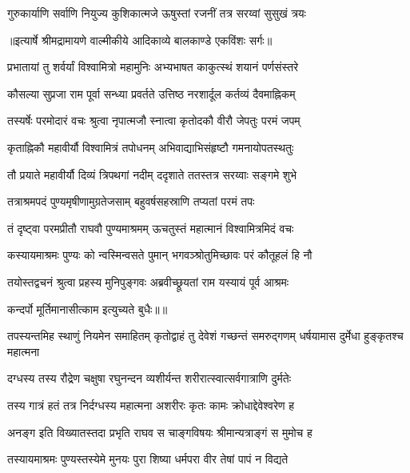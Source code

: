 \twolineshloka
{गुरुकार्याणि सर्वाणि नियुज्य कुशिकात्मजे}
{ऊषुस्तां रजनीं तत्र सरय्वां सुसुखं त्रयः} %


{॥इत्यार्षे श्रीमद्रामायणे वाल्मीकीये आदिकाव्ये बालकाण्डे एकविंशः सर्गः॥}


\twolineshloka
{प्रभातायां तु शर्वर्यां विश्वामित्रो महामुनिः}
{अभ्यभाषत काकुत्स्थं शयानं पर्णसंस्तरे} %

\twolineshloka
{कौसल्या सुप्रजा राम पूर्वा सन्ध्या प्रवर्तते}
{उत्तिष्ठ नरशार्दूल कर्तव्यं दैवमाह्निकम्} %

\twolineshloka
{तस्यर्षेः परमोदारं वचः श्रुत्वा नृपात्मजौ}
{स्नात्वा कृतोदकौ वीरौ जेपतुः परमं जपम्} %

\twolineshloka
{कृताह्निकौ महावीर्यौ विश्वामित्रं तपोधनम्}
{अभिवाद्याभिसंहृष्टौ गमनायोपतस्थतुः} %

\twolineshloka
{तौ प्रयाते महावीर्यौ दिव्यं त्रिपथगां नदीम्}
{ददृशाते ततस्तत्र सरय्वाः सङ्गमे शुभे} %

\twolineshloka
{तत्राश्रमपदं पुण्यमृषीणामुग्रतेजसाम्}
{बहुवर्षसहस्राणि तप्यतां परमं तपः} %

\twolineshloka
{तं दृष्ट्वा परमप्रीतौ राघवौ पुण्यमाश्रमम्}
{ऊचतुस्तं महात्मानं विश्वामित्रमिदं वचः} %

\twolineshloka
{कस्यायमाश्रमः पुण्यः को न्वस्मिन्वसते पुमान्}
{भगवञ्श्रोतुमिच्छावः परं कौतूहलं हि नौ} %

\twolineshloka
{तयोस्तद्वचनं श्रुत्वा प्रहस्य मुनिपुङ्गवः}
{अब्रवीच्छ्रूयतां राम यस्यायं पूर्व आश्रमः} %

{कन्दर्पो मूर्तिमानासीत्काम इत्युच्यते बुधैः॥॥} %

\addtocounter{shlokacount}{1}

\threelineshloka
{तपस्यन्तमिह स्थाणुं नियमेन समाहितम्}
{कृतोद्वाहं तु देवेशं गच्छन्तं समरुद्गणम्}
{धर्षयामास दुर्मेधा हुङ्कृतश्च महात्मना} %

\twolineshloka
{दग्धस्य तस्य रौद्रेण चक्षुषा रघुनन्दन}
{व्यशीर्यन्त शरीरात्स्वात्सर्वगात्राणि दुर्मतेः} %

\twolineshloka
{तस्य गात्रं हतं तत्र निर्दग्धस्य महात्मना}
{अशरीरः कृतः कामः क्रोधाद्देवेश्वरेण ह} %

\twolineshloka
{अनङ्ग इति विख्यातस्तदा प्रभृति राघव}
{स चाङ्गविषयः श्रीमान्यत्राङ्गं स मुमोच ह} %

\twolineshloka
{तस्यायमाश्रमः पुण्यस्तस्येमे मुनयः पुरा}
{शिष्या धर्मपरा वीर तेषां पापं न विद्यते} %

